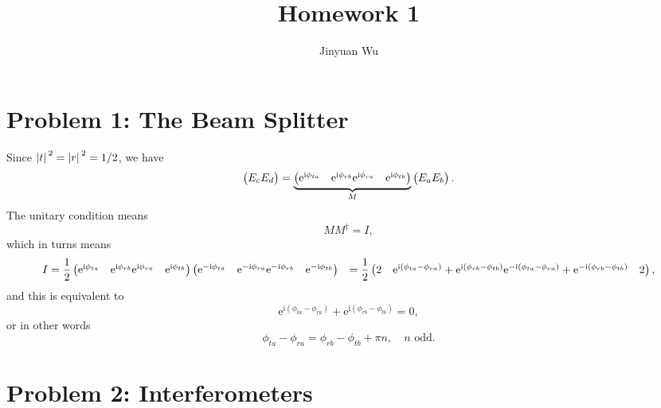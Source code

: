 \documentclass[hyperref, a4paper]{article}
\title{Homework 1}
\author{Jinyuan Wu}
\newcommand*{\ii}{\mathrm{i}}
\newcommand*{\ee}{\mathrm{e}}
\def\\{}%
\begin{document}
\maketitle 

\section{Problem 1: The Beam Splitter}

Since $\abs*{t}^2 = \abs*{r}^2 = 1/2$,
we have 
\begin{equation}
    \pmqty{E_c \\ E_d} = 
    \underbrace{
        \pmqty{
        \ee^{\ii \phi_{ta}} & \ee^{\ii \phi_{rb}} \\
        \ee^{\ii \phi_{ra}} & \ee^{\ii \phi_{tb}} 
        }
    }_M \pmqty{E_{a} \\ E_b}.
\end{equation}
The unitary condition means 
\begin{equation}
    M M^\dagger = I,
\end{equation}
which in turns means 
\[
    \begin{aligned}
        I &= \frac{1}{2} \pmqty{
            \ee^{\ii \phi_{ta}} & \ee^{\ii \phi_{rb}} \\
            \ee^{\ii \phi_{ra}} & \ee^{\ii \phi_{tb}} 
        } 
        \pmqty{
            \ee^{- \ii \phi_{ta}} & \ee^{-\ii \phi_{ra}} \\
            \ee^{- \ii \phi_{rb}} & \ee^{-\ii \phi_{tb}} 
        } \\ 
        &= \frac{1}{2} \pmqty{
            2 & \ee^{\ii (\phi_{ta} - \phi_{ra})} + \ee^{\ii (\phi_{rb} - \phi_{tb})} \\
            \ee^{- \ii (\phi_{ta} - \phi_{ra})} + \ee^{- \ii (\phi_{rb} - \phi_{tb})} & 2
        },
    \end{aligned}
\]
and this is equivalent to 
\[
    \ee^{\ii (\phi_{ta} - \phi_{ra})} + \ee^{\ii (\phi_{rb} - \phi_{tb})} = 0,
\]
or in other words 
\begin{equation}
    \phi_{ta} - \phi_{ra} = \phi_{rb} - \phi_{tb} + \pi n, \quad \text{$n$ odd}.
\end{equation}

\section{Problem 2: Interferometers}
\end{document}
